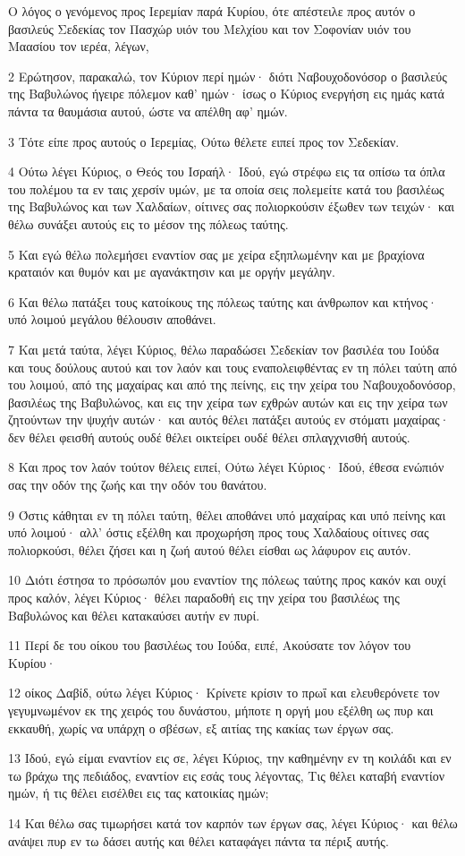 \par Ο λόγος ο γενόμενος προς Ιερεμίαν παρά Κυρίου, ότε απέστειλε προς αυτόν ο βασιλεύς Σεδεκίας τον Πασχώρ υιόν του Μελχίου και τον Σοφονίαν υιόν του Μαασίου τον ιερέα, λέγων,
\par 2 Ερώτησον, παρακαλώ, τον Κύριον περί ημών· διότι Ναβουχοδονόσορ ο βασιλεύς της Βαβυλώνος ήγειρε πόλεμον καθ' ημών· ίσως ο Κύριος ενεργήση εις ημάς κατά πάντα τα θαυμάσια αυτού, ώστε να απέλθη αφ' ημών.
\par 3 Τότε είπε προς αυτούς ο Ιερεμίας, Ούτω θέλετε ειπεί προς τον Σεδεκίαν.
\par 4 Ούτω λέγει Κύριος, ο Θεός του Ισραήλ· Ιδού, εγώ στρέφω εις τα οπίσω τα όπλα του πολέμου τα εν ταις χερσίν υμών, με τα οποία σεις πολεμείτε κατά του βασιλέως της Βαβυλώνος και των Χαλδαίων, οίτινες σας πολιορκούσιν έξωθεν των τειχών· και θέλω συνάξει αυτούς εις το μέσον της πόλεως ταύτης.
\par 5 Και εγώ θέλω πολεμήσει εναντίον σας με χείρα εξηπλωμένην και με βραχίονα κραταιόν και θυμόν και με αγανάκτησιν και με οργήν μεγάλην.
\par 6 Και θέλω πατάξει τους κατοίκους της πόλεως ταύτης και άνθρωπον και κτήνος· υπό λοιμού μεγάλου θέλουσιν αποθάνει.
\par 7 Και μετά ταύτα, λέγει Κύριος, θέλω παραδώσει Σεδεκίαν τον βασιλέα του Ιούδα και τους δούλους αυτού και τον λαόν και τους εναπολειφθέντας εν τη πόλει ταύτη από του λοιμού, από της μαχαίρας και από της πείνης, εις την χείρα του Ναβουχοδονόσορ, βασιλέως της Βαβυλώνος, και εις την χείρα των εχθρών αυτών και εις την χείρα των ζητούντων την ψυχήν αυτών· και αυτός θέλει πατάξει αυτούς εν στόματι μαχαίρας· δεν θέλει φεισθή αυτούς ουδέ θέλει οικτείρει ουδέ θέλει σπλαγχνισθή αυτούς.
\par 8 Και προς τον λαόν τούτον θέλεις ειπεί, Ούτω λέγει Κύριος· Ιδού, έθεσα ενώπιόν σας την οδόν της ζωής και την οδόν του θανάτου.
\par 9 Όστις κάθηται εν τη πόλει ταύτη, θέλει αποθάνει υπό μαχαίρας και υπό πείνης και υπό λοιμού· αλλ' όστις εξέλθη και προχωρήση προς τους Χαλδαίους οίτινες σας πολιορκούσι, θέλει ζήσει και η ζωή αυτού θέλει είσθαι ως λάφυρον εις αυτόν.
\par 10 Διότι έστησα το πρόσωπόν μου εναντίον της πόλεως ταύτης προς κακόν και ουχί προς καλόν, λέγει Κύριος· θέλει παραδοθή εις την χείρα του βασιλέως της Βαβυλώνος και θέλει κατακαύσει αυτήν εν πυρί.
\par 11 Περί δε του οίκου του βασιλέως του Ιούδα, ειπέ, Ακούσατε τον λόγον του Κυρίου·
\par 12 οίκος Δαβίδ, ούτω λέγει Κύριος· Κρίνετε κρίσιν το πρωΐ και ελευθερόνετε τον γεγυμνωμένον εκ της χειρός του δυνάστου, μήποτε η οργή μου εξέλθη ως πυρ και εκκαυθή, χωρίς να υπάρχη ο σβέσων, εξ αιτίας της κακίας των έργων σας.
\par 13 Ιδού, εγώ είμαι εναντίον εις σε, λέγει Κύριος, την καθημένην εν τη κοιλάδι και εν τω βράχω της πεδιάδος, εναντίον εις εσάς τους λέγοντας, Τις θέλει καταβή εναντίον ημών, ή τις θέλει εισέλθει εις τας κατοικίας ημών;
\par 14 Και θέλω σας τιμωρήσει κατά τον καρπόν των έργων σας, λέγει Κύριος· και θέλω ανάψει πυρ εν τω δάσει αυτής και θέλει καταφάγει πάντα τα πέριξ αυτής.

